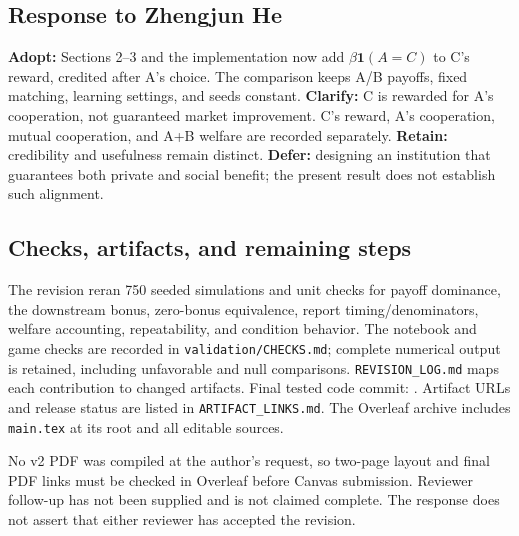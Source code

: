 \subsection*{Response to Zhengjun He}
\textbf{Adopt:} Sections 2--3 and the implementation now add $\beta\mathbf{1}(A=C)$ to C's reward, credited after A's choice. The comparison keeps A/B payoffs, fixed matching, learning settings, and seeds constant. \textbf{Clarify:} C is rewarded for A's cooperation, not guaranteed market improvement. C's reward, A's cooperation, mutual cooperation, and A+B welfare are recorded separately. \textbf{Retain:} credibility and usefulness remain distinct. \textbf{Defer:} designing an institution that guarantees both private and social benefit; the present result does not establish such alignment.

\subsection*{Checks, artifacts, and remaining steps}
The revision reran 750 seeded simulations and unit checks for payoff dominance, the downstream bonus, zero-bonus equivalence, report timing/denominators, welfare accounting, repeatability, and condition behavior. The notebook and game checks are recorded in \texttt{validation/CHECKS.md}; complete numerical output is retained, including unfavorable and null comparisons. \texttt{REVISION\_LOG.md} maps each contribution to changed artifacts. Final tested code commit: \FinalCodeCommit. Artifact URLs and release status are listed in \texttt{ARTIFACT\_LINKS.md}. The Overleaf archive includes \texttt{main.tex} at its root and all editable sources.

No v2 PDF was compiled at the author's request, so two-page layout and final PDF links must be checked in Overleaf before Canvas submission. Reviewer follow-up has not been supplied and is not claimed complete. The response does not assert that either reviewer has accepted the revision.

\clearpage\onecolumn
